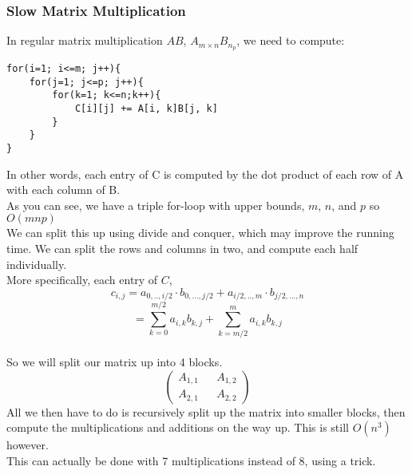 \documentclass[12pt]{article}
\theoremstyle{definition}
\begin{document}
\subsubsection{Slow Matrix Multiplication}
In regular matrix multiplication $AB$, $A_{m\times n}B_{n_p}$, we need to compute:
\begin{lstlisting}
for(i=1; i<=m; j++){
	for(j=1; j<=p; j++){
		for(k=1; k<=n;k++){
			C[i][j] += A[i, k]B[j, k]
		}
	}
}
\end{lstlisting}
In other words, each entry of C is computed by the dot product of each row of A with each column of B.
\\ \linebreak
As you can see, we have a triple for-loop with upper bounds, $m$, $n$, and $p$ so $O(mnp)$
\\ \linebreak
We can split this up using divide and conquer, which may improve the running time. We can split the rows and columns in two, and compute each half individually. 
\\ \linebreak
More specifically, each entry of $C$, $$c_{i,j} = a_{0,..,i/2} \cdot b_{0,...,j/2} + a_{i/2,..,m}\cdot b_{j/2,...,n}$$
$$ = \sum_{k=0}^{m/2} a_{i,k}b_{k,j} + \sum_{k=m/2}^m a_{i,k}b_{k, j}$$
\\ \linebreak
So we will split our matrix up into 4 blocks. 
$$\begin{pmatrix}
A_{1,1} && A_{1,2} \\
A_{2,1} && A_{2,2}
\end{pmatrix}$$
All we then have to do is recursively split up the matrix into smaller blocks, then compute the multiplications and additions on the way up. This is still $O(n^3)$ however.
\\ \linebreak
This can actually be done with 7 multiplications instead of 8, using a trick.
\\ \linebreak
\end{document}
